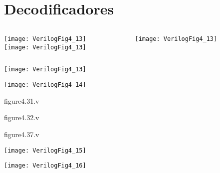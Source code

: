 

\subtitle{Circuitos Combinacionais: Conversores de códigos} %



\begin{frame}
	\titlepage
\end{frame} 

\section{Decodificadores}

\begin{frame}{\insertsection}   \centering
    \begin{columns}
        \begin{column}{0.40\textwidth}
        \texttt{[image: VerilogFig4\_13]} \\
        \texttt{[image: VerilogFig4\_13]}
        \end{column}
        \begin{column}{0.60\textwidth}
        \texttt{[image: VerilogFig4\_13]}
        \end{column}    
    \end{columns}
    \texttt{[image: VerilogFig4\_13]}
\end{frame}

\begin{frame}{\insertsection} \centering
    \texttt{[image: VerilogFig4\_14]}
\end{frame}

\begin{frame}[fragile]{figure4.31.v}
\end{frame} 

\begin{frame}[fragile]{figure4.32.v}
\end{frame} 

\begin{frame}[fragile]{figure4.37.v}
\end{frame} 

\begin{frame}{\insertsection} \centering
    \texttt{[image: VerilogFig4\_15]}
\end{frame}

\begin{frame}{\insertsection} \centering
    \texttt{[image: VerilogFig4\_16]}
\end{frame}

